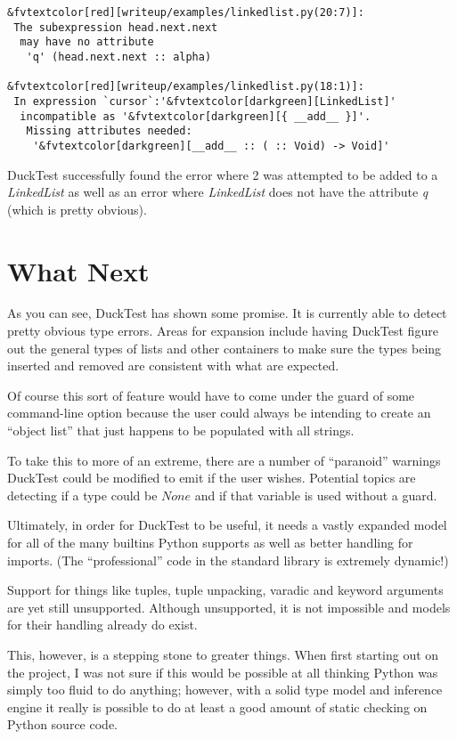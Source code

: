 \documentclass{scrartcl}
\begin{document}
\begin{multicols}{2}
\begin{Verbatim}[commandchars=&\[\]]
&fvtextcolor[red][writeup/examples/linkedlist.py(20:7)]:
 The subexpression head.next.next
  may have no attribute
   'q' (head.next.next :: alpha)

&fvtextcolor[red][writeup/examples/linkedlist.py(18:1)]:
 In expression `cursor`:'&fvtextcolor[darkgreen][LinkedList]'
  incompatible as '&fvtextcolor[darkgreen][{ __add__ }]'.
   Missing attributes needed:
    '&fvtextcolor[darkgreen][__add__ :: ( :: Void) -> Void]'
\end{Verbatim}

DuckTest successfully found the error where 2 was attempted to be added to
a \emph{LinkedList} as well as an error where \emph{LinkedList} does not have
the attribute \emph{q} (which is pretty obvious).

\section*{What Next}

As you can see, DuckTest has shown some promise. It is currently able
to detect pretty obvious type errors. Areas for expansion include
having DuckTest figure out the general types of lists and other
containers to make sure the types being inserted and removed are
consistent with what are expected.

Of course this sort of feature would have to come under the guard of
some command-line option because the user could always be intending
to create an ``object list'' that just happens to be populated with
all strings.

To take this to more of an extreme, there are a number of ``paranoid'' warnings
DuckTest could be modified to emit if the user wishes. Potential topics are
detecting if a type could be $None$ and if that variable is used without a
guard.

Ultimately, in order for DuckTest to be useful, it needs a vastly expanded
model for all of the many builtins Python supports as well as better
handling for imports. (The ``professional'' code in the standard library
is extremely dynamic!)

Support for things like tuples, tuple unpacking, varadic and keyword arguments
are yet still unsupported. Although unsupported, it is not impossible and
models for their handling already do exist.

This, however, is a stepping stone to greater things. When first starting out
on the project, I was not sure if this would be possible at all thinking Python
was simply too fluid to do anything; however, with a solid type model and inference
engine it really is possible to do at least a good amount of static checking
on Python source code.




\end{multicols}
\end{document}
